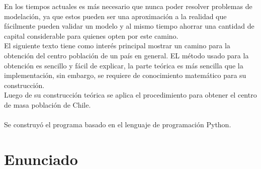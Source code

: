 \documentclass[20pt]{report}
\begin{document}
En los tiempos actuales es m\'as  necesario  que nunca poder resolver problemas de modelaci\'on, ya que estos pueden  ser una aproximaci\'on a la realidad que f\'acilmente pueden validar un modelo y al mismo tiempo ahorrar una cantidad de capital considerable para quienes opten por este camino. 
\\
El siguiente texto tiene como inter\'es principal mostrar un camino  para la obtenci\'on del centro poblaci\'on de un pa\'is en general. EL m\'etodo usado para la obtenci\'on es sencillo y f\'acil de explicar, la parte te\'orica es m\'as sencilla que la  implementaci\'on, sin embargo, se requiere de conocimiento matem\'atico para su construcci\'on. 
\\
Luego de su construcci\'on te\'orica se   aplica el procedimiento  para  obtener el centro de masa poblaci\'on de  Chile.
\\
\\
Se construy\'o el programa basado  en el lenguaje de programaci\'on Python.

\pagebreak



\chapter{Enunciado }\label{cap.introduccion}
\end{document}
